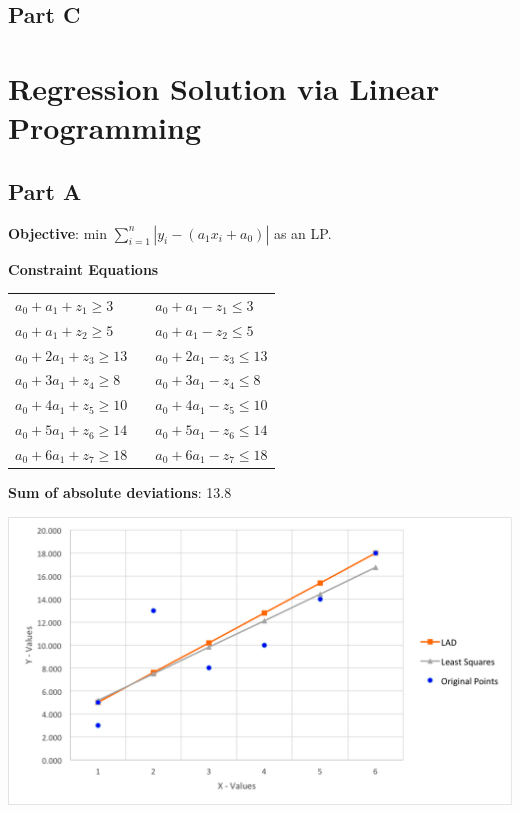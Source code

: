 \documentclass[11pt,letterpaper]{article}
\begin{document}
\subsection*{Part C}


\section{Regression Solution via Linear Programming}
\subsection*{Part A}
\textbf{Objective}: min $\sum\limits_{i=1}^n |y_i -  (a_1x_i + a_0)|$ as an LP.\vspace{8pt}

\textbf{Constraint Equations}

\begin{tabular}{l l l}
$a_0+a_1+z_1\geq3$	&  & $a_0+a_1-z_1\leq3$\\
$a_0+a_1+z_2\geq5$ 	& & $a_0+a_1-z_2\leq5$\\
$a_0+2a_1+z_3\geq13$	& & $a_0+2a_1-z_3\leq13$\\
$a_0+3a_1+z_4\geq8$	& & $a_0+3a_1-z_4\leq8$\\
$a_0+4a_1+z_5\geq10$	& & $a_0+4a_1-z_5\leq10$\\
$a_0+5a_1+z_6\geq14$	& & $a_0+5a_1-z_6\leq14$\\
$a_0+6a_1+z_7\geq18$	& & $a_0+6a_1-z_7\leq18$\\
\end{tabular}\vspace{8pt}


\textbf{Sum of absolute deviations}: 13.8\vspace{8pt}


\centerline{\includegraphics[width=7in]{lad.png}}\vspace{8pt}
\end{document}
